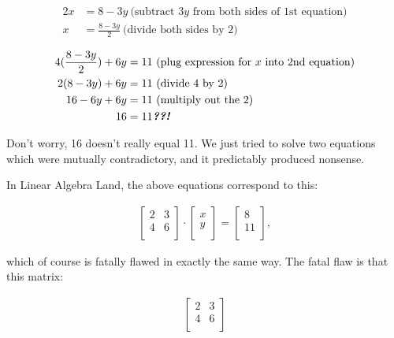 \vspace{-.25in}
\begin{align*}
2x &= 8 - 3y \ \text{(subtract $3y$ from both sides of 1st equation)} \\
x &= \frac{8 - 3y}{2} \ \text{(divide both sides by 2)} \\
\end{align*}
\vspace{-.55in}
\begin{align*}
4(\frac{8-3y}{2}) + 6y &= 11 \ \text{(plug expression for $x$ into 2nd equation)} \\
2(8-3y) + 6y &= 11 \ \text{(divide 4 by 2)} \\
16 - 6y + 6y &= 11 \ \text{(multiply out the 2)} \\
16 &= 11 \textit{\textbf{??!}}
\end{align*}
\vspace{-.25in}

Don't worry, 16 doesn't really equal 11. We just tried to solve two equations
which were mutually contradictory, and it predictably produced nonsense.

\smallskip

In Linear Algebra Land, the above equations correspond to this:

\vspace{-.15in}
\begin{align*}
\begin{bmatrix}
2 & 3 \\
4 & 6 \\
\end{bmatrix} \cdot
\begin{bmatrix}
x \\ y \\
\end{bmatrix} =
\begin{bmatrix}
8 \\ 11 \\
\end{bmatrix},
\end{align*}
\vspace{-.15in}

which of course is fatally flawed in exactly the same way. The fatal flaw is
that this matrix:

\vspace{-.15in}
\begin{align*}
\begin{bmatrix}
2 & 3 \\
4 & 6 \\
\end{bmatrix}
\end{align*}
\vspace{-.15in}

